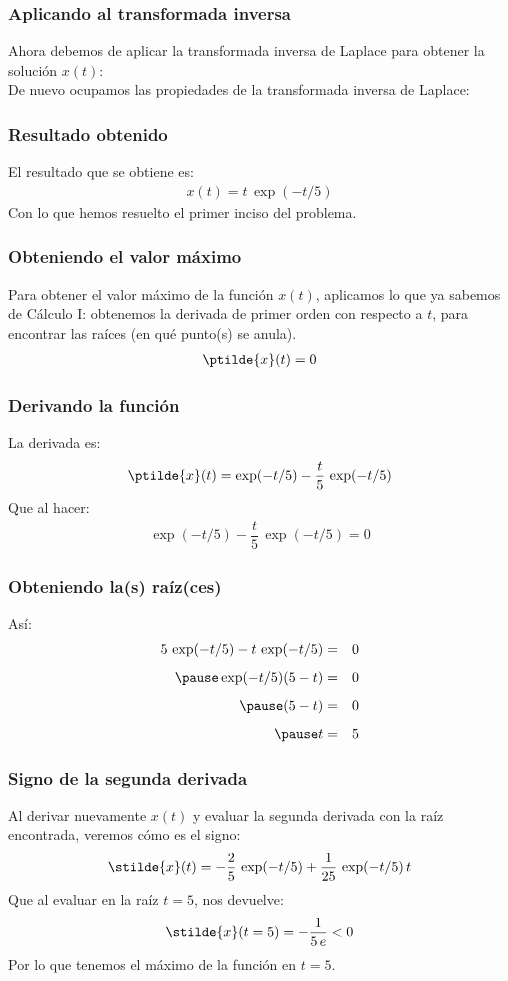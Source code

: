 \begin{frame}
\frametitle{Aplicando al transformada inversa}
Ahora debemos de aplicar la transformada inversa de Laplace para obtener la solución $x(t)$:
\\
\bigskip
\pause
De nuevo ocupamos las propiedades de la transformada inversa de Laplace:
\end{frame}
\begin{frame}
\frametitle{Resultado obtenido}
El resultado que se obtiene es:
\pause
\begin{align*}
x(t) = t \, \exp (-t/5)
\end{align*}
Con lo que hemos resuelto el primer inciso del problema.
\end{frame}
\begin{frame}
\frametitle{Obteniendo el valor máximo}
Para obtener el valor máximo de la función $x(t)$, aplicamos lo que ya sabemos de Cálculo I: \pause obtenemos la derivada de primer orden con respecto a $t$, para encontrar las raíces (en qué punto(s) se anula).
\begin{align*}
\ptilde{x}(t) = 0
\end{align*}
\end{frame}
\begin{frame}
\frametitle{Derivando la función}
La derivada es:
\begin{align*}
\ptilde{x}(t) = \exp(-t/5) - \dfrac{t}{5} \, \exp(-t/5) 
\end{align*}
\pause
Que al hacer:
\begin{align*}
\exp(-t/5) - \dfrac{t}{5} \, \exp(-t/5) = 0
\end{align*}
\end{frame}
\begin{frame}
\frametitle{Obteniendo la(s) raíz(ces)}
Así:
\begin{eqnarray*}
5 \, \exp(-t/5) - t \, \exp(-t/5) &=& 0  \\[0.5em] \pause
\exp(-t/5) (5 - t) &=& 0 \\[0.5em] \pause
(5 - t) &=& 0 \\[0.5em] \pause
t &=& 5
\end{eqnarray*}
\end{frame}
\begin{frame}
\frametitle{Signo de la segunda derivada}
Al derivar nuevamente $x(t)$ y evaluar la segunda derivada con la raíz encontrada, veremos cómo es el signo:
\begin{align*}
\stilde{x}(t) = -\dfrac{2}{5} \, \exp(-t/5) + \dfrac{1}{25} \, \exp(-t/5) \, t
\end{align*}
\pause
Que al evaluar en la raíz $t = 5$, nos devuelve: \pause
\begin{align*}
\stilde{x}(t=5) = - \dfrac{1}{5 \, e} < 0
\end{align*}
\pause
Por lo que tenemos el máximo de la función en $t = 5$.
\end{frame}
